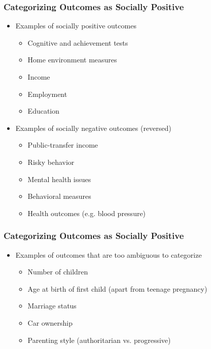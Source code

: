 \documentclass[static]{JJH-Beamer}
\begin{document}

\begin{frame}
\frametitle{Categorizing Outcomes as Socially Positive} \label{cat_outcomes}
\begin{itemize}
	\item Examples of socially positive outcomes
	\begin{itemize}
		\item Cognitive and achievement tests  
		\item Home environment measures
		\item Income
		\item Employment 
		\item Education 
	\end{itemize}
	\item Examples of socially negative outcomes (reversed)
	\begin{itemize}
		\item Public-transfer income
		\item Risky behavior
		\item Mental health issues
		\item Behavioral measures
		\item Health outcomes (e.g. blood pressure)
	\end{itemize}
\end{itemize}
\hyperlink{m_hypotheses}{}
\end{frame}


\begin{frame}
\frametitle{Categorizing Outcomes as Socially Positive}
\begin{itemize}
	\item Examples of outcomes that are too ambiguous to categorize
	\begin{itemize}
		\item Number of children
		\item Age at birth of first child (apart from teenage pregnancy)
		\item Marriage status
		\item Car ownership
		\item Parenting style (authoritarian vs. progressive)
	\end{itemize}
\end{itemize}
\hyperlink{m_hypotheses}{}
\end{frame}
\end{document}
